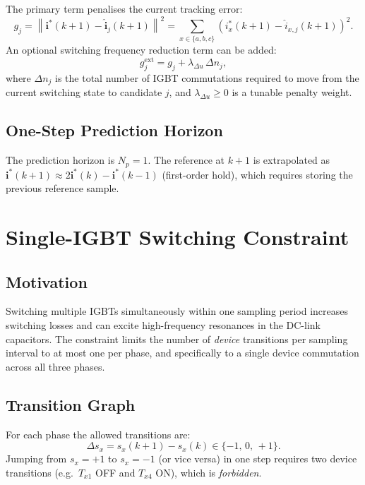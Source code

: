 \documentclass[11pt,a4paper]{article}
\newcommand{\iref}{\bm{i}^{*}}
\newcommand{\ipred}{\hat{\bm{i}}}
\begin{document}
The primary term penalises the current tracking error:
\begin{equation}
  g_j = \left\|\iref(k+1) - \ipred_j(k+1)\right\|^2
      = \sum_{x \in \{a,b,c\}}
        \left(i_x^*(k+1) - \hat{i}_{x,j}(k+1)\right)^2.
  \label{eq:cost}
\end{equation}
An optional switching frequency reduction term can be added:
\begin{equation}
  g_j^{\mathrm{ext}} = g_j + \lambda_{\Delta u}\,\Delta n_j,
  \label{eq:costext}
\end{equation}
where $\Delta n_j$ is the total number of IGBT commutations required to
move from the current switching state to candidate $j$, and
$\lambda_{\Delta u} \geq 0$ is a tunable penalty weight.

\subsection{One-Step Prediction Horizon}
\label{sec:horizon}

The prediction horizon is $N_p = 1$.  The reference at $k+1$ is
extrapolated as $\iref(k+1) \approx 2\iref(k) - \iref(k-1)$ (first-order
hold), which requires storing the previous reference sample.

\section{Single-IGBT Switching Constraint}
\label{sec:constraint}

\subsection{Motivation}
\label{sec:constr_mot}

Switching multiple IGBTs simultaneously within one sampling period
increases switching losses and can excite high-frequency resonances in the
DC-link capacitors.  The constraint limits the number of \emph{device}
transitions per sampling interval to at most one per phase, and
specifically to a single device commutation across all three phases.

\subsection{Transition Graph}
\label{sec:graph}

For each phase the allowed transitions are:
\begin{equation}
  \Delta s_x = s_x(k+1) - s_x(k) \in \{-1,\, 0,\, +1\}.
\end{equation}
Jumping from $s_x = +1$ to $s_x = -1$ (or vice versa) in one step
requires two device transitions (e.g.\ $T_{x1}$ OFF and $T_{x4}$ ON),
which is \emph{forbidden}.
\end{document}
